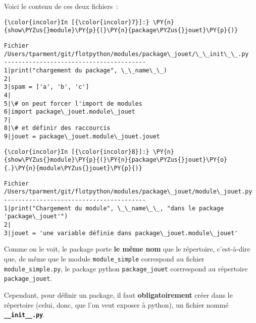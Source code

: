     Voici le contenu de ces deux fichiers~:

    \begin{Verbatim}[commandchars=\\\{\},frame=single,framerule=0.3mm,rulecolor=\color{cellframecolor}]
{\color{incolor}In [{\color{incolor}7}]:} \PY{n}{show\PYZus{}module}\PY{p}{(}\PY{n}{package\PYZus{}jouet}\PY{p}{)}
\end{Verbatim}


    \begin{Verbatim}[commandchars=\\\{\},frame=single,framerule=0.3mm,rulecolor=\color{cellframecolor}]
Fichier /Users/tparment/git/flotpython/modules/package\_jouet/\_\_init\_\_.py
----------------------------------------
1|print("chargement du package", \_\_name\_\_)
2|
3|spam = ['a', 'b', 'c']
4|
5|\# on peut forcer l'import de modules
6|import package\_jouet.module\_jouet
7|
8|\# et définir des raccourcis
9|jouet = package\_jouet.module\_jouet.jouet
\end{Verbatim}

    \begin{Verbatim}[commandchars=\\\{\},frame=single,framerule=0.3mm,rulecolor=\color{cellframecolor}]
{\color{incolor}In [{\color{incolor}8}]:} \PY{n}{show\PYZus{}module}\PY{p}{(}\PY{n}{package\PYZus{}jouet}\PY{o}{.}\PY{n}{module\PYZus{}jouet}\PY{p}{)}
\end{Verbatim}


    \begin{Verbatim}[commandchars=\\\{\},frame=single,framerule=0.3mm,rulecolor=\color{cellframecolor}]
Fichier /Users/tparment/git/flotpython/modules/package\_jouet/module\_jouet.py
----------------------------------------
1|print("Chargement du module", \_\_name\_\_, "dans le package 'package\_jouet'")
2|
3|jouet = 'une variable définie dans package\_jouet.module\_jouet'
\end{Verbatim}

    Comme on le voit, le package porte \textbf{le même nom} que le
répertoire, c'est-à-dire que, de même que le module
\texttt{module\_simple} correspond au fichier
\texttt{module\_simple.py}, le package python \texttt{package\_jouet}
corrrespond au répertoire \texttt{package\_jouet}.

    Cependant, pour définir un package, il faut \textbf{obligatoirement}
créer dans le répertoire (celui, donc, que l'on veut exposer à python),
un fichier nommé \textbf{\texttt{\_\_init\_\_.py}}.

